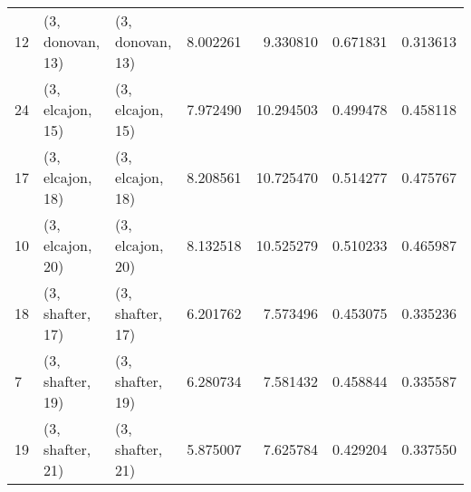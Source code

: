 \begin{tabular}{lllrrrr}
12 &  (3, donovan, 13) &  (3, donovan, 13) &  8.002261 &   9.330810 &   0.671831 &  0.313613 \\
24 &  (3, elcajon, 15) &  (3, elcajon, 15) &  7.972490 &  10.294503 &   0.499478 &  0.458118 \\
17 &  (3, elcajon, 18) &  (3, elcajon, 18) &  8.208561 &  10.725470 &   0.514277 &  0.475767 \\
10 &  (3, elcajon, 20) &  (3, elcajon, 20) &  8.132518 &  10.525279 &   0.510233 &  0.465987 \\
18 &  (3, shafter, 17) &  (3, shafter, 17) &  6.201762 &   7.573496 &   0.453075 &  0.335236 \\
7  &  (3, shafter, 19) &  (3, shafter, 19) &  6.280734 &   7.581432 &   0.458844 &  0.335587 \\
19 &  (3, shafter, 21) &  (3, shafter, 21) &  5.875007 &   7.625784 &   0.429204 &  0.337550 \\
\bottomrule
\end{tabular}
